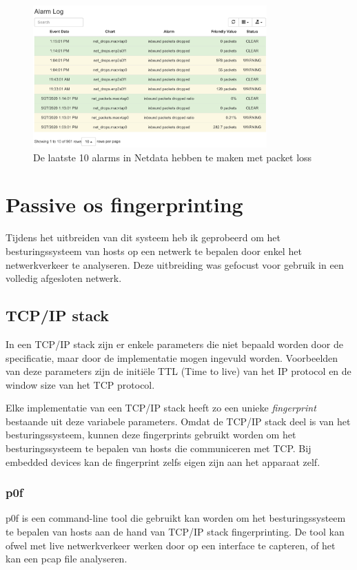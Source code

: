 \documentclass[a4paper,12pt]{report}
\begin{document}
\begin{figure}[H]
  \centering
  \includegraphics[width=0.8\textwidth]{netdata-packet-loss}
  \caption{De laatste 10 alarms in Netdata hebben te maken met packet loss}
  \label{fig:netdata-packet-loss}
\end{figure}

\section{Passive os fingerprinting}
Tijdens het uitbreiden van dit systeem heb ik geprobeerd om het besturingssysteem van hosts op een netwerk te bepalen door enkel het netwerkverkeer te analyseren.
Deze uitbreiding was gefocust voor gebruik in een volledig afgesloten netwerk.
\subsection{TCP/IP stack}
In een TCP/IP stack zijn er enkele parameters die niet bepaald worden door de specificatie, maar door de implementatie mogen ingevuld worden.
Voorbeelden van deze parameters zijn de initiële TTL (Time to live) van het IP protocol en de window size van het TCP protocol.
\autocite{wikipedia:fingerprinting}

Elke implementatie van een TCP/IP stack heeft zo een unieke \emph{fingerprint} bestaande uit deze variabele parameters.
Omdat de TCP/IP stack deel is van het besturingssysteem, kunnen deze fingerprints gebruikt worden om het besturingssysteem te bepalen van hosts die communiceren met TCP.
Bij embedded devices kan de fingerprint zelfs eigen zijn aan het apparaat zelf.

\subsubsection{p0f}
p0f is een command-line tool die gebruikt kan worden om het besturingssysteem te bepalen van hosts aan de hand van TCP/IP stack fingerprinting.
De tool kan ofwel met live netwerkverkeer werken door op een interface te capteren, of het kan een pcap file analyseren.
\end{document}
